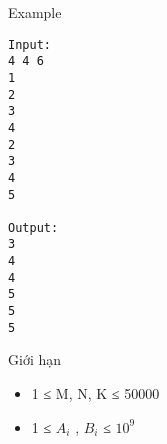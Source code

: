Example  
\begin{verbatim}
Input:
4 4 6
1
2
3
4
2
3
4
5

Output:
3
4
4
5
5
5
\end{verbatim}
   Giới hạn  
\begin{itemize}
	\item     1 ≤ M, N, K ≤ 50000   
	\item     1 ≤ $A_{i}$    , $B_{i}$    ≤ $10^{9}$
\end{itemize}